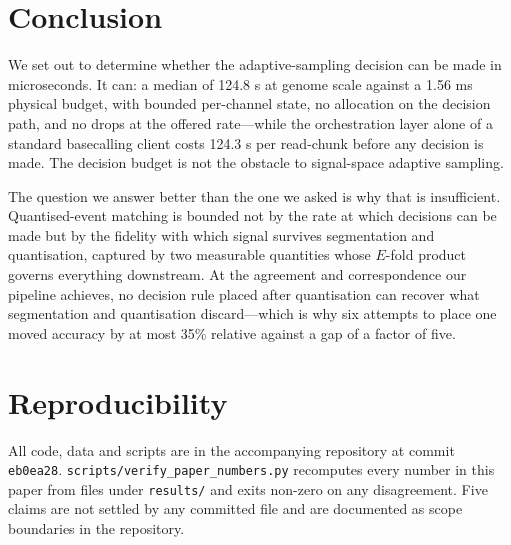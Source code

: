 \documentclass[runningheads]{llncs}
\begin{document}
\section{Conclusion}

We set out to determine whether the adaptive-sampling decision can be made in microseconds. It
can: a median of 124.8 \textmu{}s at genome scale against a 1.56 ms physical budget, with bounded
per-channel state, no allocation on the decision path, and no drops at the offered rate---while
the orchestration layer alone of a standard basecalling client costs 124.3 \textmu{}s per read-chunk
before any decision is made. The decision budget is not the obstacle to signal-space adaptive
sampling.

The question we answer better than the one we asked is why that is insufficient. Quantised-event
matching is bounded not by the rate at which decisions can be made but by the fidelity with which
signal survives segmentation and quantisation, captured by two measurable quantities whose
$E$-fold product governs everything downstream. At the agreement and correspondence our pipeline
achieves, no decision rule placed after quantisation can recover what segmentation and
quantisation discard---which is why six attempts to place one moved accuracy by at most 35\%
relative against a gap of a factor of five.

\section*{Reproducibility}

All code, data and scripts are in the accompanying repository at commit \texttt{eb0ea28}.
\texttt{scripts/verify\_paper\_numbers.py} recomputes every number in this paper from files
under \texttt{results/} and exits non-zero on any disagreement. Five claims are not settled by any
committed file and are documented as scope boundaries in the repository.
\end{document}
